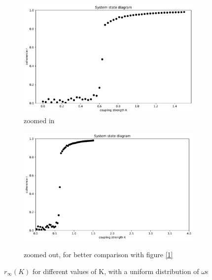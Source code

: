 \documentclass[11pt,a4paper]{article}
\begin{document}
\begin{figure}[h]
	\centering
	\begin{subfigure}{0.9\textwidth}
		\includegraphics[width = \textwidth]{graphics/3_K-vs-r_omegaDistr=uniform_zoomed_N=2000_1611568972.pdf}
		\caption{zoomed in}
		\label{3zoomedin}
	\end{subfigure}
	\begin{subfigure}{0.9\textwidth}
		\includegraphics[width = \textwidth]{graphics/3_K-vs-r_omegaDistr=uniform_N=2000_1611568972.pdf}
		\label{3zoomedout}
		\caption{zoomed out, for better comparison with figure \ref{1}}
	\end{subfigure}
	\caption{$r_\infty(K)$ for different values of K, with a uniform distribution of $\omega$s}
	\label{3}
\end{figure}
\end{document}
